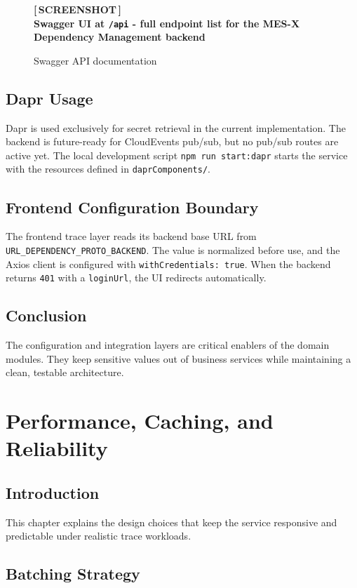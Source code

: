 \documentclass[12pt,a4paper]{report}
\newcommand{\screenshot}[2][Screenshot placeholder]{%
  \begin{figure}[H]
    \centering
    \begin{tcolorbox}[
      enhanced,
      colback=screenshotbg,
      colframe=screenshotborder,
      boxrule=1pt,
      arc=4pt,
      left=4pt, right=4pt, top=4pt, bottom=4pt,
      width=\textwidth,
      height=7cm,
      valign=center,
    ]
      \centering
      \color{primary}
      \large\bfseries [\,SCREENSHOT\,]\\[6pt]
      \normalsize\normalfont\color{darkgray}#1
    \end{tcolorbox}
    \caption{#2}
  \end{figure}%
}
\newcommand{\code}[1]{\texttt{\small\color{codered}#1}}
\begin{document}
\screenshot[Swagger UI at \texttt{/api} - full endpoint list for the MES-X Dependency Management backend]{Swagger API documentation}

\section{Dapr Usage}

Dapr is used exclusively for secret retrieval in the current implementation.
The backend is future-ready for CloudEvents pub/sub, but no pub/sub routes are
active yet. The local development script \code{npm run start:dapr} starts the
service with the resources defined in \code{daprComponents/}.

\section{Frontend Configuration Boundary}

The frontend trace layer reads its backend base URL from
\code{URL\_DEPENDENCY\_PROTO\_BACKEND}. The value is normalized before use, and
the Axios client is configured with \code{withCredentials: true}. When the
backend returns \code{401} with a \code{loginUrl}, the UI redirects automatically.

\section{Conclusion}

The configuration and integration layers are critical enablers of the domain
modules. They keep sensitive values out of business services while maintaining a
clean, testable architecture.

\chapter{Performance, Caching, and Reliability}

\section{Introduction}

This chapter explains the design choices that keep the service responsive and
predictable under realistic trace workloads.

\section{Batching Strategy}
\end{document}
